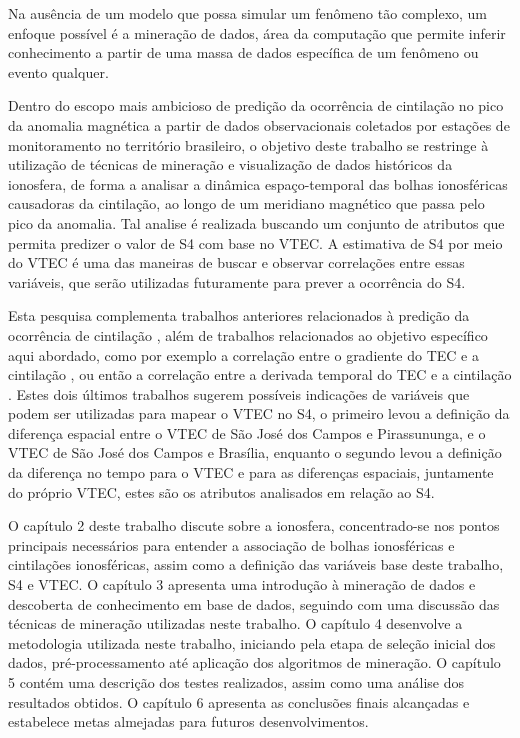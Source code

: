 Na ausência de um modelo que possa simular um fenômeno tão complexo, um enfoque possível é a mineração de dados, área da computação que permite inferir conhecimento a partir de uma massa de dados específica de um fenômeno ou evento qualquer.

Dentro do escopo mais ambicioso de predição da ocorrência de cintilação no pico da anomalia magnética a partir de dados observacionais coletados por estações de monitoramento no território brasileiro, o objetivo deste trabalho se restringe à utilização de técnicas de mineração e visualização de dados históricos da ionosfera, de forma a analisar a dinâmica espaço-temporal das bolhas ionosféricas causadoras da cintilação, ao longo de um meridiano magnético que passa pelo pico da anomalia. Tal analise é realizada buscando um conjunto de atributos que permita predizer o valor de S4 com base no VTEC. A estimativa de S4 por meio do VTEC é uma das maneiras de buscar e observar correlações entre essas variáveis, que serão utilizadas futuramente para prever a ocorrência do S4. 

Esta pesquisa complementa trabalhos anteriores relacionados à predição da ocorrência de cintilação \cite{REZENDE:2009, GLAUSTON:2014, GLAUSTON:2015}, além de trabalhos relacionados ao objetivo específico aqui abordado, como por exemplo a correlação entre o gradiente do TEC e a cintilação \cite{RAGHAVARAO:1998, RAY:2006}, ou então a correlação entre a derivada temporal do TEC e a cintilação \cite{RAGHUNATH:2016}. Estes dois últimos trabalhos sugerem possíveis indicações de variáveis que podem ser utilizadas para mapear o VTEC no S4, o primeiro levou a definição da diferença espacial entre o VTEC de São José dos Campos e Pirassununga, e o VTEC de São José dos Campos e Brasília, enquanto o segundo levou a definição da diferença no tempo para o VTEC e para as diferenças espaciais, juntamente do próprio VTEC, estes são os atributos analisados em relação ao S4.

O capítulo 2 deste trabalho discute sobre a ionosfera, concentrado-se nos pontos principais necessários para entender a associação de bolhas ionosféricas e cintilações ionosféricas, assim como a definição das variáveis base deste trabalho, S4 e VTEC. O capítulo 3 apresenta uma introdução à mineração de dados e descoberta de conhecimento em base de dados, seguindo com uma discussão das técnicas de mineração utilizadas neste trabalho. O capítulo 4 desenvolve a metodologia utilizada neste trabalho, iniciando pela etapa de seleção inicial dos dados, pré-processamento até aplicação dos algoritmos de mineração. O capítulo 5 contém uma descrição dos testes realizados, assim como uma análise dos resultados obtidos. O capítulo 6 apresenta as conclusões finais alcançadas e estabelece metas almejadas para futuros desenvolvimentos.

